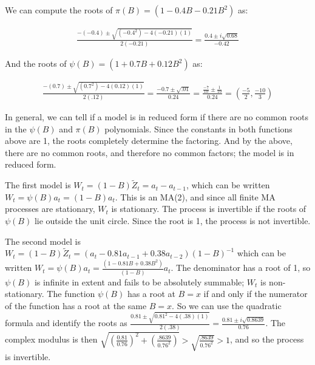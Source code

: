 \documentclass[12pt, letterpaper]{article}
\theoremstyle{definition}
\numberwithin{equation}{section}
\newcommand{\+}[1]{+_{\scalebox{.375}{#1}}}
\newcommand{\1}{\mathbbm{1}}
\begin{document}
We can compute the roots of $\pi(B)=(1-0.4B-0.21B^2)$ as:

\vspace{-0.5cm}
\begin{align*}
	\frac{-(-0.4) \pm \sqrt{(-0.4^2)-4(-0.21)(1)}}{2(-0.21)}=\frac{0.4 \pm i\sqrt{0.68}}{-0.42}
\end{align*}
 
And the roots of $\psi(B)=(1+0.7B+0.12B^2)$ as:

\vspace{-0.5cm}
\begin{align*}
	\frac{-(0.7) \pm \sqrt{(0.7^2)-4(0.12)(1)}}{2(.12)}=\frac{-0.7 \pm \sqrt{.01}}{0.24}=\frac{\frac{-7}{10} \pm \frac{1}{10}}{0.24}=\left(\frac{-5}{2}, \frac{-10}{3}\right)
\end{align*} 
 
In general, we can tell if a model is in reduced form if there are no common roots in the $\psi(B)$ and $\pi(B)$ polynomials. Since the constants in both functions above are 1, the roots completely determine the factoring. And by the above, there are no common roots, and therefore no common factors; the model is in reduced form. 
\vspace{\baselineskip} 



\noindent\textbf{}
\vspace{\baselineskip}

The first model is $W_t=(1-B)\tilde{Z}_t=a_t-a_{t-1}$, which can be written $W_t=\psi(B)a_t=(1-B)a_t$. This is an MA(2), and since all finite MA processes are stationary, $W_t$ is stationary. The process is invertible if the roots of $\psi(B)$ lie outside the unit circle. Since the root is 1, the process is not invertible.
\vspace{\baselineskip}

The second model is $W_t=(1-B)\tilde{Z}_t=\left(a_t-0.81a_{t-1}+0.38a_{t-2}\right)(1-B)^{-1}$ which can be written $W_t=\psi(B)a_t=\frac{(1-0.81B+0.38B^2)}{(1-B)}a_t$. The denominator has a root of 1, so $\psi(B)$ is infinite in extent and fails to be absolutely summable; $W_t$ is non-stationary. The function $\psi(B)$ has a root at $B=x$ if and only if the numerator of the function has a root at the same $B=x$. So we can use the quadratic formula and identify the roots as $\frac{0.81 \pm \sqrt{0.81^2-4(.38)(1)}}{2(.38)}=\frac{0.81 \pm i\sqrt{0.8639}}{0.76}$. The complex modulus is then $\sqrt{\left(\frac{0.81}{0.76}\right)^2+\left(\frac{.8639}{0.76^2}\right)} > \sqrt{\frac{.8639}{0.76^2}} > 1$, and so the process is invertible.
\end{document}
